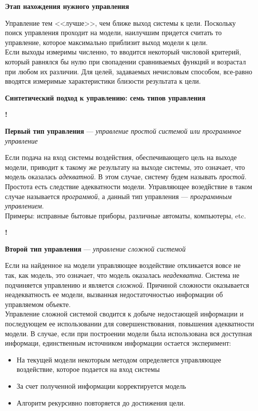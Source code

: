 \documentclass{article}
\newcommand{\note}[1]{\textit{#1}}
\renewcommand{\subsection}[1]{
	\vspace{2em}
	\begin{flushright}
		\large
		\textbf{#1}
	\end{flushright}
	}
\newcommand{\define}[2]{
	\textbf{#1} --- #2
	}
\newcommand{\marked}[2]{
	\begin{flushright}\textbf{!}\hspace{2ex}\vline\hspace{2ex}
		\begin{minipage}{0.9\textwidth}
			\define{#1}{#2}
		\end{minipage}
	\end{flushright}
	}
\begin{document}
\subsection{Этап нахождения нужного управления}
Управление тем <<лучше>>, чем ближе выход системы к цели. Поскольку поиск управления проходит на модели, наилучшим придется считать то управление, которое максимально приблизит выход модели к цели.\\
Если выходы измеримы численно, то вводится некоторый числовой критерий, который равнялся бы нулю при свопадении сравниваемых функций и возрастал при любом их различии. Для целей, задаваемых нечисловым способом, все-равно вводятся измеримые характеристики близости результата к цели.
\subsection{Синтетический подход к управлению: семь типов управления}
\marked{Первый тип управления}{\note{управление простой системой или программное управление}}
Если подача на вход системы воздействия, обеспечивающего цель на выходе модели, приводит к такому же результату на выходе системы, это означает, что модель оказалась \note{адекватной}. В этом случае, систему будем называть \note{простой}. Простота есть следствие адекватности модели. Управляющее возедйствие в таком случае называется \note{программой}, а данный тип управления --- \note{программным управлением}.\\
Примеры: исправные бытовые приборы, различные автоматы, компьютеры, etc.
\marked{Второй тип управления}{\note{управление сложной системой}}
Если на найденное на модели управляющее воздействие откликается вовсе не так, как модель, это означает, что модель оказалась \note{неадекватна}. Система не подчиняется управлению и является \note{сложной}. Причиной сложности оказывается неадекватность ее модели, вызванная недостаточностью информации об управляемом объекте.\\
Управление сложной системой сводится к добыче недостающей информации и последующем ее использовании для совершенствования, повышения адекватности модели. В случае, если при построении модели была использована вся доступная информаци, единственным источником информации остается эксперимент:
\begin{itemize}
	\item На текущей модели некоторым методом определяется управляющее воздействие, которое подается на вход системы
	\item За счет полученной информации корректируется модель
	\item Алгоритм рекурсивно повторяется до достижения цели.
\end{itemize}
\end{document}
